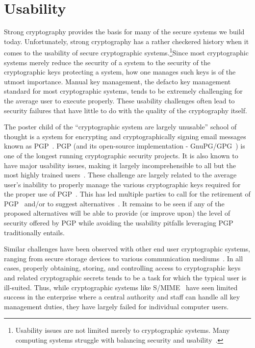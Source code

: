 \section{Usability}
\label{chap:background:usability}

Strong cryptography provides the basis for many of the secure systems
we build today. Unfortunately, strong cryptography has a rather
checkered history when it comes to the usability of secure
cryptographic systems.\footnote{Usability issues are not limited
  merely to cryptographic systems. Many computing systems struggle
  with balancing security and usability~\cite{furnell2006,
    ibrahim2010}.}Since most cryptographic systems merely reduce the
security of a system to the security of the cryptographic keys
protecting a system, how one manages such keys is of the utmost
importance. Manual key management, the defacto key management
standard for most cryptographic systems, tends to be extremely
challenging for the average user to execute properly. These usability
challenges often lead to security failures that have little to do with
the quality of the cryptography itself.

The poster child of the ``cryptographic system are largely unusable''
school of thought is a system for encrypting and cryptographically
signing email messages known as PGP~\cite{callas2007}. PGP (and its
open-source implementation - GnuPG/GPG~\cite{gnupg}) is one of the
longest running cryptographic security projects. It is also known to
have major usability issues, making it largely incomprehensible to all
but the most highly trained users~\cite{whitten1999}. These challenge
are largely related to the average user's inability to properly manage
the various cryptographic keys required for the proper use of
PGP~\cite{green-challenge}. This has led multiple parties to call for
the retirement of PGP~\cite{green-pgp} and/or to suggest
alternatives~\cite{borisov2004, mailpile, openwhisper,
  google-endtoend}. It remains to be seen if any of the proposed
alternatives will be able to provide (or improve upon) the level of
security offered by PGP while avoiding the usability pitfalls
leveraging PGP traditionally entails.

Similar challenges have been observed with other end user
cryptographic systems, ranging from secure storage devices to various
communication mediums~\cite{sweikata2009}. In all cases, properly
obtaining, storing, and controlling access to cryptographic keys and
related cryptographic secrets tends to be a task for which the typical
user is ill-suited. Thus, while cryptographic systems like
S/MIME~\cite{ramsdell-rfc5751} have seen limited success in the
enterprise where a central authority and staff can handle all key
management duties, they have largely failed for individual computer
users.

